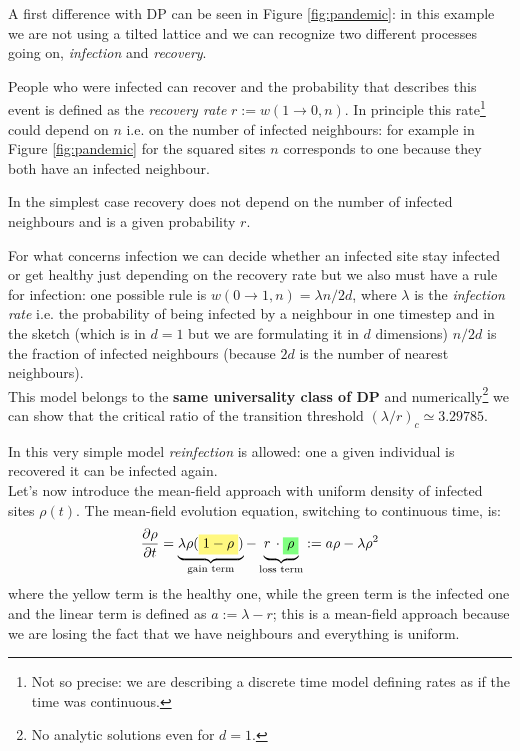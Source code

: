 \documentclass[\main/main.tex]{subfiles}
\begin{document}
A first difference with DP can be seen in Figure \ref{fig:pandemic}: in this example we are not using a tilted lattice and we can recognize two different processes going on, \textit{infection} and \textit{recovery}.

People who were infected can recover and the probability that describes this event is defined as the \textit{recovery rate} $r:=w(1\to 0,n)$. In principle this rate\footnote{Not so precise: we are describing a discrete time model defining rates as if the time was continuous.} could depend on $n$ i.e. on the number of infected neighbours: for example in Figure \ref{fig:pandemic} for the squared sites $n$ corresponds to one because they both have an infected neighbour.

In the simplest case recovery does not depend on the number of infected neighbours and is a given probability $r$.

For what concerns infection we can decide whether an infected site stay infected or get healthy just depending on the recovery rate but we also must have a rule for infection: one possible rule is $w(0\to 1,n)=\lambda n/2d$, where $\lambda$ is the \textit{infection rate} i.e. the probability of being infected by a neighbour in one timestep and in the sketch (which is in $d=1$ but we are formulating it in $d$ dimensions) $n/2d$ is the fraction of infected neighbours (because $2d$ is the number of nearest neighbours). \\

This model belongs to the \textbf{same universality class of DP} and numerically\footnote{No analytic solutions even for $d=1$.} we can show that the critical ratio of the transition threshold $(\lambda/r)_c\simeq 3.29785$.

In this very simple model \textit{reinfection} is allowed: one a given individual is recovered it can be infected again. \\

Let's now introduce the mean-field approach with uniform density of infected sites $\rho(t)$. The mean-field evolution equation, switching to continuous time, is:
\begin{equation}
    \frac{\partial \rho}{\partial t}=\underbrace{\lambda \rho(\hlc{yellow}{1-\rho})}_{\text{gain term}}-\underbrace{r\,\cdot \hlc{green}{\rho}}_{\text{loss term}} := a \rho-\lambda \rho^{2}
\end{equation}
where the yellow term is the healthy one, while the green term is the infected one and the linear term is defined as $a:=\lambda - r$; this is a mean-field approach because we are losing the fact that we have neighbours and everything is uniform.
\end{document}
